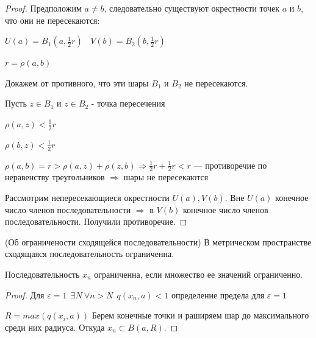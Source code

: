     \begin{proof}
        Предположим $a \neq b$, следовательно существуют окрестности точек $a$ и $b$, что они не пересекаются: 
        
        $U(a) = B_1(a, \frac{1}{2}r) \ \ \ \ V(b) = B_2(b, \frac{1}{2}r)$ 
        
        $r = \rho(a,b)$
        
        Докажем от противного, что эти шары  $B_1$  и $B_2$ не пересекаются.
        
        Пусть $z \in B_1$ и $z \in B_2$ - точка пересечения
        
        $\rho(a, z) < \frac{1}{2} r$
        
        $\rho(b, z) < \frac{1}{2} r$
        
        $\rho(a, b) = r > \rho(a, z) + \rho(z, b)  \Rightarrow \frac{1}{2}r + \frac{1}{2}r < r$ {---} противоречие по неравенству треугольников $\Rightarrow$ шары не пересекаются
         
        Рассмотрим непересекающиеся окрестности $U(a), V(b)$. Вне $U(a)$ конечное число членов последовательности $\Longrightarrow$ в $V(b)$ конечное число членов последовательности. Получили противоречие.
    \end{proof}
    
    \begin{theorem*} (Об ограничености сходящейся последовательности)
        В метрическом пространстве сходящаяся последовательность ограниченна.
        
        Последовательность $x_n$ ограниченна, если множество ее значений ограниченно.
    \end{theorem*}
    \begin{proof}
        Для $\varepsilon = 1 \ \ \exists N \ \forall n > N \ \ q(x_n, a) < 1$ определение предела для $\varepsilon = 1$
        
        $R = max(q(x_i, a))$ Берем конечные точки и раширяем шар до максимального среди них радиуса. Откуда $x_n \subset B(a, R)$.
    \end{proof}
    
\newpage
